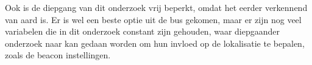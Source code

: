 Ook is de diepgang van dit onderzoek vrij beperkt, omdat het eerder verkennend van aard is. Er is wel een beste optie uit de bus gekomen, maar er zijn nog veel variabelen die in dit onderzoek constant zijn gehouden, waar diepgaander onderzoek naar kan gedaan worden om hun invloed op de lokalisatie te bepalen, zoals de beacon instellingen.